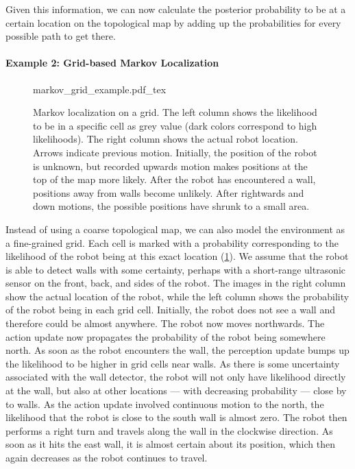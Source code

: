 Given this information, we can now calculate the posterior probability to be at a certain location on the topological map by adding up the probabilities for every possible path to get there.

\paragraph{Example 2: Grid-based Markov Localization}

\begin{figure}
	\centering
    \def\svgwidth{\textwidth}
    {markov_grid_example.pdf_tex}
	\caption{Markov localization on a grid. The left column shows the likelihood to be in a specific cell as grey value (dark colors correspond to high likelihoods). The right column shows the actual robot location. Arrows indicate previous motion. Initially, the position of the robot is unknown, but recorded upwards motion makes positions at the top of the map more likely. After the robot has encountered a wall, positions away from walls become unlikely. After rightwards and down motions, the possible positions have shrunk to a small area.}
	\label{fig:markov_grid_example}
\end{figure}

Instead of using a coarse topological map, we can also model the environment as a fine-grained grid. Each cell is marked with a probability corresponding to the likelihood of the robot being at this exact location (\cref{fig:markov_grid_example}). We assume that the robot is able to detect walls with some certainty, perhaps with a short-range ultrasonic sensor on the front, back, and sides of the robot. The images in the right column show the actual location of the robot, while the left column shows the probability of the robot being in each grid cell. Initially, the robot does not see a wall and therefore could be almost anywhere. The robot now moves northwards. The action update now propagates the probability of the robot being somewhere north. As soon as the robot encounters the wall, the perception update bumps up the likelihood to be higher in grid cells near walls. As there is some uncertainty associated with the wall detector, the robot will not only have likelihood directly at the wall, but also at other locations --- with decreasing probability --- close by to walls. As the action update involved continuous motion to the north, the likelihood that the robot is close to the south wall is almost zero. The robot then performs a right turn and travels along the wall in the clockwise direction. As soon as it hits the east wall, it is almost certain about its position, which then again decreases as the robot continues to travel.

